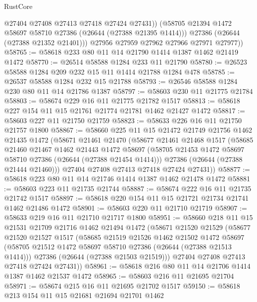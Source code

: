 \begin{lexlean}{RustCore}
\begin{coremodule}
              @27404
              @27408
              @27413
              @27418
              @27424
              @27431))
          (@58705 @21394 @1472 @58697 @58710 @27386 (@26644 (@27388 @21395 @1414)))
          @27386
          (@26644 (@27388 @21352 @21401)))
        @27956
        @27959
        @27962
        @27966
        @27971
        @27977))
@58765 := @58618 @233 @80 @11 @14 @21790 @1414 @1387 @1462 @21419 @1472
@58770 := @26514 @58588 @1284 @233 @11 @21790
@58780 := @26523 @58588 @1284 @209 @232 @15 @11 @1414 @21788 @1284 @478
@58785 := @26537 @58588 @1284 @232 @15 @21788
@58793 := @26546 @58588 @1284 @230 @80 @11 @14 @21786 @1387
@58797 := @58603 @230 @11 @21775 @21784
@58803 := @58674 @229 @16 @11 @21775 @21782 @1517
@58813 := @58618 @227 @154 @11 @15 @21761 @21774 @21781 @1462 @21427 @1472
@58817 := @58603 @227 @11 @21750 @21759
@58823 := @58633 @226 @16 @11 @21750 @21757 @1800
@58867 := @58660
    @225
    @11
    @15
    @21472
    @21749
    @21756
    @1462
    @21435
    @1472
    (@58671
      @21461
      @21470
      (@58677
        @21461
        @21468
        @1517
        (@58685
          @21460
          @21467
          @1462
          @21443
          @1472
          @58697
          (@58705 @21453 @1472 @58697 @58710 @27386 (@26644 (@27388 @21454 @1414)))
          @27386
          (@26644 (@27388 @21444 @21460)))
        @27404
        @27408
        @27413
        @27418
        @27424
        @27431))
@58877 := @58618 @223 @80 @11 @14 @21746 @1414 @1387 @1462 @21478 @1472
@58881 := @58603 @223 @11 @21735 @21744
@58887 := @58674 @222 @16 @11 @21735 @21742 @1517
@58897 := @58618 @220 @154 @11 @15 @21721 @21734 @21741 @1462 @21486 @1472
@58901 := @58603 @220 @11 @21710 @21719
@58907 := @58633 @219 @16 @11 @21710 @21717 @1800
@58951 := @58660
    @218
    @11
    @15
    @21531
    @21709
    @21716
    @1462
    @21494
    @1472
    (@58671
      @21520
      @21529
      (@58677
        @21520
        @21527
        @1517
        (@58685
          @21519
          @21526
          @1462
          @21502
          @1472
          @58697
          (@58705 @21512 @1472 @58697 @58710 @27386 (@26644 (@27388 @21513 @1414)))
          @27386
          (@26644 (@27388 @21503 @21519)))
        @27404
        @27408
        @27413
        @27418
        @27424
        @27431))
@58961 := @58618 @216 @80 @11 @14 @21706 @1414 @1387 @1462 @21537 @1472
@58965 := @58603 @216 @11 @21695 @21704
@58971 := @58674 @215 @16 @11 @21695 @21702 @1517
@59150 := @58618
    @213
    @154
    @11
    @15
    @21681
    @21694
    @21701
    @1462

\end{coremodule}
\end{lexlean}
